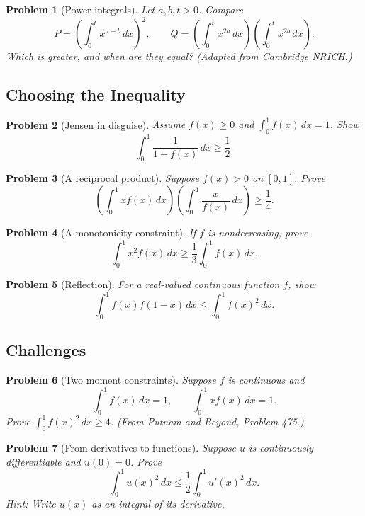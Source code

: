\documentclass[11pt]{article}
\theoremstyle{plaincolon}
\theoremstyle{definitioncolon}
\newtheorem{problem}{Problem} %
\theoremstyle{remarkcolon}
\numberwithin{equation}{section}
\begin{document}
\begin{problem}[Power integrals]
Let $a,b,t>0$. Compare
\[
P=\left(\int_0^t x^{a+b}\,dx\right)^2,
\qquad
Q=\left(\int_0^t x^{2a}\,dx\right)
\left(\int_0^t x^{2b}\,dx\right).
\]
Which is greater, and when are they equal? \emph{(Adapted from Cambridge NRICH.)}
\end{problem}

\subsection{Choosing the Inequality}

\begin{problem}[Jensen in disguise]
Assume $f(x)\ge0$ and $\int_0^1 f(x)\,dx=1$. Show
\[
\int_0^1\frac{1}{1+f(x)}\,dx\ge\frac12.
\]
\end{problem}

\begin{problem}[A reciprocal product]
Suppose $f(x)>0$ on $[0,1]$. Prove
\[
\left(\int_0^1 xf(x)\,dx\right)
\left(\int_0^1\frac{x}{f(x)}\,dx\right)\ge\frac14.
\]
\end{problem}

\begin{problem}[A monotonicity constraint]
If $f$ is nondecreasing, prove
\[
\int_0^1 x^2f(x)\,dx\ge\frac13\int_0^1 f(x)\,dx.
\]
\end{problem}

\begin{problem}[Reflection]
For a real-valued continuous function $f$, show
\[
\int_0^1 f(x)f(1-x)\,dx\le\int_0^1 f(x)^2\,dx.
\]
\end{problem}

\subsection{Challenges}

\begin{problem}[Two moment constraints]
Suppose $f$ is continuous and
\[
\int_0^1 f(x)\,dx=1,\qquad
\int_0^1 xf(x)\,dx=1.
\]
Prove $\int_0^1 f(x)^2\,dx\ge4$.
\emph{(From \emph{Putnam and Beyond}, Problem 475.)}
\end{problem}

\begin{problem}[From derivatives to functions]
Suppose $u$ is continuously differentiable and $u(0)=0$. Prove
\[
\int_0^1 u(x)^2\,dx\le\frac12\int_0^1u'(x)^2\,dx.
\]
\emph{Hint: Write $u(x)$ as an integral of its derivative.}
\end{problem}
\end{document}

